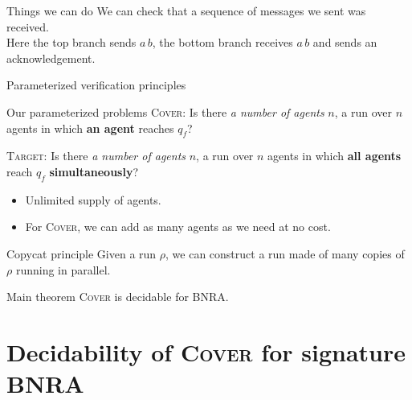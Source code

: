 \documentclass{beamer}
\newcommand{\COVER}{\textsc{Cover}\xspace}
\newcommand{\TARGET}{\textsc{Target}\xspace}
\begin{document}
\begin{frame}{Things we can do}
	We can check that a sequence of messages we sent was received. \\
	Here the top branch sends $a \, b$, the bottom branch receives $a \, b$ and sends an acknowledgement. 
	\vspace{0.5cm}

		\centering
		
\end{frame}

\begin{frame}{Parameterized verification principles}
	
	\begin{block}{Our parameterized problems}
		{\COVER}: Is there \emph{a number of agents} $n$, a run over $n$ agents in which \textbf{an agent} reaches $q_f$?
		
		{\TARGET}: Is there \emph{a number of agents} $n$, a run over $n$ agents in which \textbf{all agents} reach $q_f$ \textbf{simultaneously}?
	\end{block}
	
	\pause

	\begin{itemize}
		\item Unlimited supply of agents.
		
		\item For {\COVER}, we can add as many agents as we need at no cost. 
	\end{itemize}
	
	\pause
	
	\begin{block}{Copycat principle}
		Given a run $\rho$, we can construct a run made of many copies of $\rho$ running in parallel.
	\end{block}
	
	\pause 

	\begin{block}{Main theorem}
		{\COVER} is decidable for BNRA.
	\end{block}
	
\end{frame}







\section{Decidability of \COVER for signature BNRA}
\end{document}
